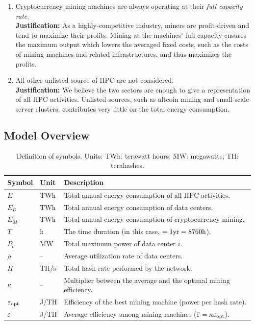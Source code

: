 \documentclass[12pt]{article}
\begin{document}
\begin{enumerate}
	\item Cryptocurrency mining machines are always operating at their \textit{full capacity rate}. \\
	\textbf{Justification:} As a highly-competitive industry, miners are profit-driven and tend to maximize their profits. Mining at the machines' full capacity ensures the maximum output which lowers the averaged fixed costs, such as the costs of mining machines and related infrastructures, and thus maximizes the profits.

	\item All other unlisted source of HPC are not considered. \\
	\textbf{Justification:} We believe the two sectors are enough to give a representation of all HPC activities. Unlisted sources, such as altcoin mining and small-scale server clusters, contributes very little on the total energy consumption.
\end{enumerate}

\subsection{Model Overview}

\begin{table}[t]
	\centering
	\caption{Definition of symbols. Units: TWh: terawatt hours; MW: megawatts; TH: terahashes.}
	\label{table_symbols_q1}
	\begin{tabular}{lll}
		\hline
		\textbf{Symbol} & \textbf{Unit} & \textbf{Description} \\
		\hline
		$E$ & TWh & Total annual energy consumption of all HPC activities. \\
		$E_D$ & TWh & Total annual energy consumption of data centers. \\
		$E_M$ & TWh & Total annual energy consumption of cryptocurrency mining. \\
		$T$ & h & The time duration (in this case, $\rm = 1yr = 8760h$). \\
		$P_i$ & MW & Total maximum power of data center $i$. \\
		$\overline{\rho}$ & -- & Average utilization rate of data centers. \\
		$H$ & TH/s & Total hash rate performed by the network. \\
		$\kappa$ & -- & Multiplier between the average and the optimal mining efficiency. \\
		$\varepsilon_{\rm opt}$ & J/TH & Efficiency of the best mining machine (power per hash rate). \\
		$\overline{\varepsilon}$ & J/TH & Average efficiency among mining machines ($\overline{\varepsilon} = \kappa \varepsilon_{\rm opt}$). \\
		\hline
	\end{tabular}
\end{table}
\end{document}
